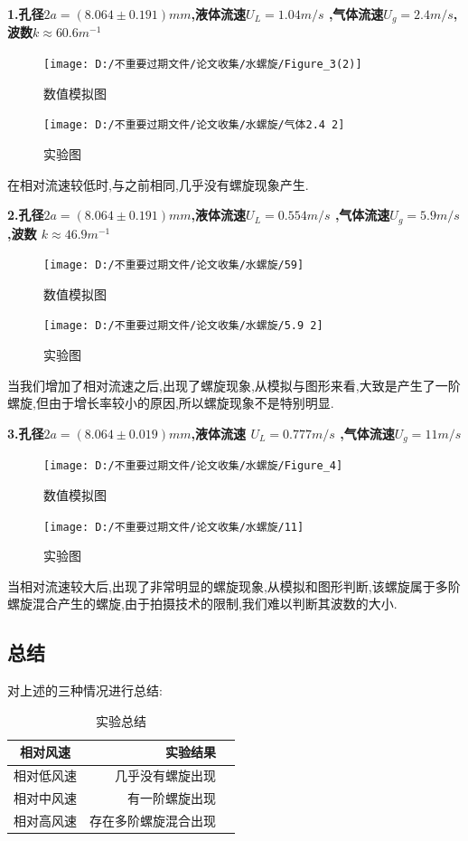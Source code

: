\documentclass[UTF8]{gapd}
\begin{document}
\textbf{1.孔径$2a=(8.064 \pm 0.191)mm$,液体流速$U_{L}=1.04m/s$ ,气体流速$U_{g}=2.4m/s$,波数$k \approx60.6m^{-1}$}
\begin{figure}[H]
	\centering
	\texttt{[image: D:/不重要过期文件/论文收集/水螺旋/Figure\_3(2)]}
	\caption{数值模拟图}
	\label{fig:P2}
\end{figure}
\begin{figure}[H]
	\centering
	\texttt{[image: D:/不重要过期文件/论文收集/水螺旋/气体2.4 2]}
	\caption{实验图}
	\label{fig:P2}
\end{figure}

在相对流速较低时,与之前相同,几乎没有螺旋现象产生.

\textbf{2.孔径$2a=(8.064 \pm 0.191)mm$,液体流速$U_{L}=0.554m/s$            ,气体流速$U_{g}=5.9m/s$                   ,波数 $k \approx46.9m^{-1}$}
\begin{figure}[H]
	\centering
	\texttt{[image: D:/不重要过期文件/论文收集/水螺旋/59]}
	\caption{数值模拟图}
	\label{fig:P2}
\end{figure}
\begin{figure}[H]
	\centering
	\texttt{[image: D:/不重要过期文件/论文收集/水螺旋/5.9 2]}
	\caption{实验图}
	\label{fig:P2}
\end{figure}   

当我们增加了相对流速之后,出现了螺旋现象,从模拟与图形来看,大致是产生了一阶螺旋,但由于增长率较小的原因,所以螺旋现象不是特别明显.

\textbf{3.孔径$2a=(8.064 \pm 0.019)mm$,液体流速 $U_{L}=0.777m/s$                     ,气体流速$U_{g}=11m/s$                  }
\begin{figure}[H]
	\centering
	\texttt{[image: D:/不重要过期文件/论文收集/水螺旋/Figure\_4]}
	\caption{数值模拟图}
	\label{fig:P2}
\end{figure}
\begin{figure}[H]
	\centering
	\texttt{[image: D:/不重要过期文件/论文收集/水螺旋/11]}
	\caption{实验图}
	\label{fig:P2}
\end{figure}    

当相对流速较大后,出现了非常明显的螺旋现象,从模拟和图形判断,该螺旋属于多阶螺旋混合产生的螺旋,由于拍摄技术的限制,我们难以判断其波数的大小.

\subsection{总结}
对上述的三种情况进行总结:
\begin{table}[H]
\begin{tabular}{|c|r|l}\hline
相对风速&实验结果	\\ \hline
相对低风速&几乎没有螺旋出现\\\hline
相对中风速&有一阶螺旋出现\\\hline
相对高风速&存在多阶螺旋混合出现\\\hline
\end{tabular}
\caption{实验总结}
\end{table}
\end{document}
